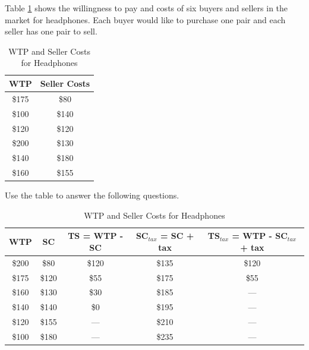 \documentclass[addpoints,11pt]{exam}
\theoremstyle{definition}
\begin{document}
\begin{questions}


	\question Table \ref{SA2} shows the willingness to pay and costs of six buyers and sellers in the market for headphones. Each buyer would like to purchase one pair and each seller has one pair to sell. 
	
\begin{table}[H]
		\caption{WTP and Seller Costs for Headphones}
		\centering
		\begin{tabular}{c|c} 
			
			WTP   & Seller Costs \\
			\hline
			\$175 & \$80 \\
			\$100 & \$140 \\
			\$120 & \$120 \\
			\$200 & \$130 \\
			\$140 & \$180 \\
			\$160 & \$155\\
		\end{tabular}
		\label{SA2}
\end{table}

Use the table to answer the following questions.

\begin{solution}
	\begin{table}[H]
		\caption{WTP and Seller Costs for Headphones}
		\centering
		\begin{tabular}{c|c|c|c|c} 
			
			WTP   & SC  & TS = WTP - SC  &  SC$_{tax}$ = SC + tax & TS$_{tax}$ = WTP - SC$_{tax}$ + tax \\
			\hline
			\$200 & \$80  & \$120 & \$135 & \$120 \\
			\$175 & \$120 & \$55 & \$175 & \$55 \\
			\$160 & \$130 & \$30 & \$185 & --- \\
			\$140 & \$140 & \$0 &  \$195 & --- \\
			\$120 & \$155  & --- & \$210 & --- \\
			\$100 & \$180 & --- & \$235 & --- \\
		\end{tabular}
	\end{table}
\end{solution}
	
	
\end{questions}
\end{document}

